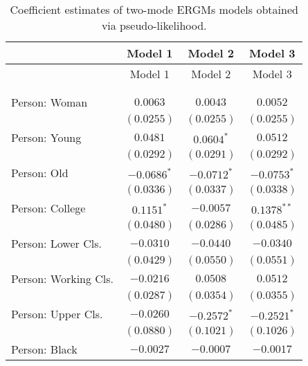 
\begin{center}
\begin{longtable}{l c c c}
\toprule
 & Model 1 & Model 2 & Model 3 \\
\midrule
\endfirsthead
\toprule
 & Model 1 & Model 2 & Model 3 \\
\midrule
\endhead
\bottomrule
\endfoot
\bottomrule
\multicolumn{4}{l}{\scriptsize{$^{***}p<0.001$; $^{**}p<0.01$; $^{*}p<0.05$}}\\
\caption{Coefficient estimates of two-mode ERGMs models obtained via pseudo-likelihood.}
\label{tab:reg3}
\endlastfoot \\
Person: Woman                       & $0.0063$        & $0.0043$       & $0.0052$        \\
                                    & $(0.0255)$      & $(0.0255)$     & $(0.0255)$      \\
Person: Young                       & $0.0481$        & $0.0604^{*}$   & $0.0512$        \\
                                    & $(0.0292)$      & $(0.0291)$     & $(0.0292)$      \\
Person: Old                         & $-0.0686^{*}$   & $-0.0712^{*}$  & $-0.0753^{*}$   \\
                                    & $(0.0336)$      & $(0.0337)$     & $(0.0338)$      \\
Person: College                     & $0.1151^{*}$    & $-0.0057$      & $0.1378^{**}$   \\
                                    & $(0.0480)$      & $(0.0286)$     & $(0.0485)$      \\
Person: Lower Cls.                  & $-0.0310$       & $-0.0440$      & $-0.0340$       \\
                                    & $(0.0429)$      & $(0.0550)$     & $(0.0551)$      \\
Person: Working Cls.                & $-0.0216$       & $0.0508$       & $0.0512$        \\
                                    & $(0.0287)$      & $(0.0354)$     & $(0.0355)$      \\
Person: Upper Cls.                  & $-0.0260$       & $-0.2572^{*}$  & $-0.2521^{*}$   \\
                                    & $(0.0880)$      & $(0.1021)$     & $(0.1026)$      \\
Person: Black                       & $-0.0027$       & $-0.0007$      & $-0.0017$       \\

\end{longtable}
\end{center}
